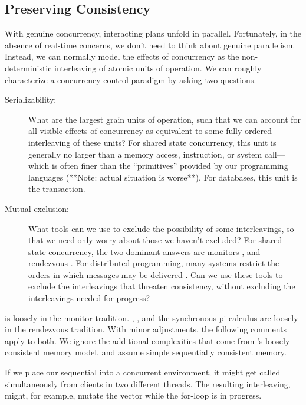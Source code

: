 \documentclass{llncs}
\begin{document}
\subsection{Preserving Consistency}

With genuine concurrency, interacting plans unfold in
parallel. Fortunately, in the absence of real-time concerns, we don't
need to think about genuine parallelism. Instead, we can normally
model the effects of concurrency as the non-deterministic interleaving
of atomic units of operation. We can roughly characterize a
concurrency-control paradigm by asking two questions.

\begin{description}
\item[Serializability:] What are the largest grain units of operation,
such that we can account for all visible effects of concurrency as
equivalent to some fully ordered interleaving of these units?
\cite{IBM:POO} For shared state concurrency, this unit is generally no
larger than a memory access, instruction, or system call---which is
often finer than the ``primitives'' provided by our programming
languages \cite{boehm:threads} (**Note: actual situation is
worse**). For databases, this unit is the transaction.

\item[Mutual exclusion:] What tools can we use to exclude the
possibility of some interleavings, so that we need only worry about
those we haven't excluded? For shared state concurrency, the two
dominant answers are monitors \cite{hoare:monitors,hansen:monitors},
and rendezvous \cite{hoare:csp}. For distributed programming, many
systems restrict the orders in which messages may be delivered
\cite{birman:vsync,amir:thesis,lamport:paxos}. Can we use these tools
to exclude the interleavings that threaten consistency, without
excluding the interleavings needed for progress?
\end{description}

 is loosely in the monitor tradition. ,
, and the synchronous pi calculus are loosely in
the rendezvous tradition. With minor adjustments, the following
comments apply to both. We ignore the additional complexities that
come from 's loosely consistent memory model, and assume
simple sequentially consistent memory.

If we place our sequential  into a concurrent
environment, it might get called simultaneously from clients in two
different threads. The resulting interleaving, might, for example,
mutate the  vector while the for-loop is in progress.
\end{document}

